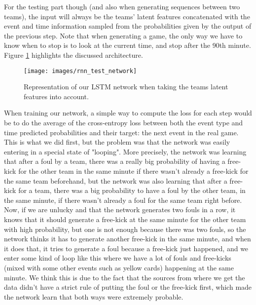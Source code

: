 \documentclass[10pt,conference,onecolumn]{IEEEtran}
\begin{document}
For the testing part though (and also when generating sequences between two teams), the input will always be the teams' latent features concatenated with the event and time information sampled from the probabilities given by the output of the previous step. Note that when generating a game, the only way we have to know when to stop is to look at the current time, and stop after the 90th minute. Figure \ref{fig:rnn_test_network} highlights the discussed architecture.

\begin{figure}[H]
\centering
\texttt{[image: images/rnn\_test\_network]}
\caption{Representation of our LSTM network when taking the teams latent features into account.}
\label{fig:rnn_test_network}
\end{figure}

When training our network, a simple way to compute the loss for each step would be to do the average of the cross-entropy loss between both the event type and time predicted probabilities and their target: the next event in the real game. This is what we did first, but the problem was that the network was easily entering in a special state of "looping". More precisely, the network was learning that after a foul by a team, there was a really big probability of having a free-kick for the other team in the same minute if there wasn't already a free-kick for the same team beforehand, but the network was also learning that after a free-kick for a team, there was a big probability to have a foul by the other team, in the same minute, if there wasn't already a foul for the same team right before. Now, if we are unlucky and that the network generates two fouls in a row, it knows that it should generate a free-kick at the same minute for the other team with high probability, but one is not enough because there was two fouls, so the network thinks it has to generate another free-kick in the same minute, and when it does that, it tries to generate a foul because a free-kick just happened, and we enter some kind of loop like this where we have a lot of fouls and free-kicks (mixed with some other events such as yellow cards) happening at the same minute. We think this is due to the fact that the sources from where we get the data didn't have a strict rule of putting the foul or the free-kick first, which made the network learn that both ways were extremely probable.
\end{document}
